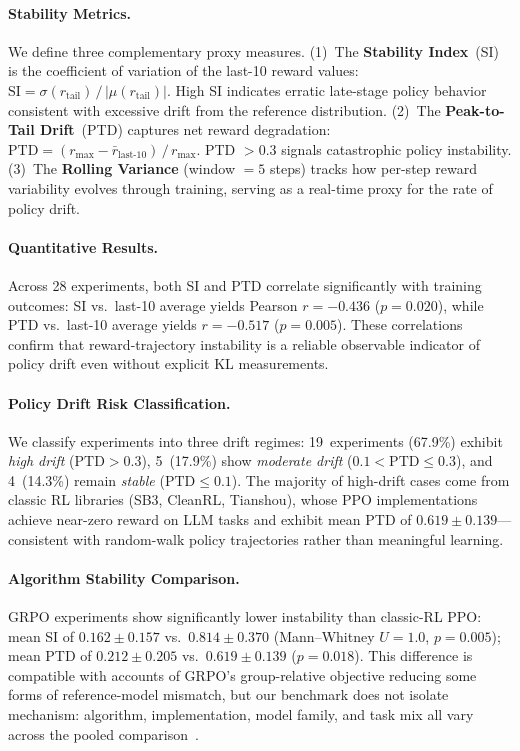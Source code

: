 \documentclass{article}
\begin{document}
\paragraph{Stability Metrics.}
We define three complementary proxy measures.
(1)~The \textbf{Stability Index}~(SI) is the coefficient of variation of
the last-10 reward values:
$\mathrm{SI} = \sigma(r_{\text{tail}}) \,/\, |\mu(r_{\text{tail}})|$.
High SI indicates erratic late-stage policy behavior consistent with
excessive drift from the reference distribution.
(2)~The \textbf{Peak-to-Tail Drift}~(PTD) captures net reward degradation:
$\mathrm{PTD} = (r_{\max} - \bar{r}_{\text{last-10}}) \,/\, r_{\max}$.
PTD $> 0.3$ signals catastrophic policy instability.
(3)~The \textbf{Rolling Variance} (window $= 5$ steps) tracks how
per-step reward variability evolves through training, serving as a
real-time proxy for the rate of policy drift.

\paragraph{Quantitative Results.}
Across 28 experiments, both SI and PTD correlate significantly with
training outcomes:
SI vs.\ last-10 average yields Pearson $r = -0.436$ ($p = 0.020$),
while PTD vs.\ last-10 average yields $r = -0.517$ ($p = 0.005$).
These correlations confirm that reward-trajectory instability is a
reliable observable indicator of policy drift even without explicit
KL measurements.

\paragraph{Policy Drift Risk Classification.}
We classify experiments into three drift regimes:
19~experiments (67.9\%) exhibit \emph{high drift}
($\text{PTD} > 0.3$), 5~(17.9\%) show \emph{moderate drift}
($0.1 < \text{PTD} \leq 0.3$), and 4~(14.3\%) remain \emph{stable}
($\text{PTD} \leq 0.1$). The majority of high-drift cases come from
classic RL libraries (SB3, CleanRL, Tianshou), whose PPO
implementations achieve near-zero reward on LLM tasks and exhibit
mean PTD of $0.619 \pm 0.139$---consistent with random-walk policy
trajectories rather than meaningful learning.

\paragraph{Algorithm Stability Comparison.}
GRPO experiments show significantly lower instability than classic-RL PPO:
mean SI of $0.162 \pm 0.157$ vs.\ $0.814 \pm 0.370$
(Mann--Whitney $U = 1.0$, $p = 0.005$); mean PTD of $0.212 \pm 0.205$
vs.\ $0.619 \pm 0.139$ ($p = 0.018$).
This difference is compatible with accounts of GRPO's group-relative
objective reducing some forms of reference-model mismatch, but our benchmark
does not isolate mechanism: algorithm, implementation, model family, and task
mix all vary across the pooled comparison~\citep{shao2024deepseekmath}.
\end{document}
